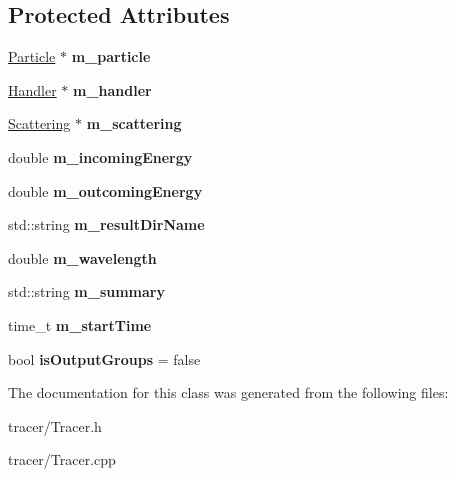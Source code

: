 \subsection*{Protected Attributes}
\begin{DoxyCompactItemize}
\item 
\mbox{\label{class_tracer_a1053837fa4c97fdeec8ea4397921209e}} 
\mbox{\hyperlink{class_particle}{Particle}} $\ast$ {\bfseries m\+\_\+particle}
\item 
\mbox{\label{class_tracer_a60e4a42a32f2b3cf928403b44bd214e7}} 
\mbox{\hyperlink{class_handler}{Handler}} $\ast$ {\bfseries m\+\_\+handler}
\item 
\mbox{\label{class_tracer_a19bfa6da3a9bf2b40e001a99598d1f46}} 
\mbox{\hyperlink{class_scattering}{Scattering}} $\ast$ {\bfseries m\+\_\+scattering}
\item 
\mbox{\label{class_tracer_ab3756356e40ed07a654df3935b7531ab}} 
double {\bfseries m\+\_\+incoming\+Energy}
\item 
\mbox{\label{class_tracer_a29d72e7162606a3d6dbba00c50e61ce9}} 
double {\bfseries m\+\_\+outcoming\+Energy}
\item 
\mbox{\label{class_tracer_ac0e7ebee01337d820acd883f19b7c26f}} 
std\+::string {\bfseries m\+\_\+result\+Dir\+Name}
\item 
\mbox{\label{class_tracer_a08936f3fe9cd42c0d5eab497c701fb68}} 
double {\bfseries m\+\_\+wavelength}
\item 
\mbox{\label{class_tracer_a051998c8471ebe0a0a26823b5f21f31c}} 
std\+::string {\bfseries m\+\_\+summary}
\item 
\mbox{\label{class_tracer_ae2a7b9e6e60693099fffbccca7a1dea6}} 
time\+\_\+t {\bfseries m\+\_\+start\+Time}
\item 
\mbox{\label{class_tracer_a5bb5e8c120182d824c89738f185065e5}} 
bool {\bfseries is\+Output\+Groups} = false
\end{DoxyCompactItemize}


The documentation for this class was generated from the following files\+:\begin{DoxyCompactItemize}
\item 
tracer/Tracer.\+h\item 
tracer/Tracer.\+cpp\end{DoxyCompactItemize}
